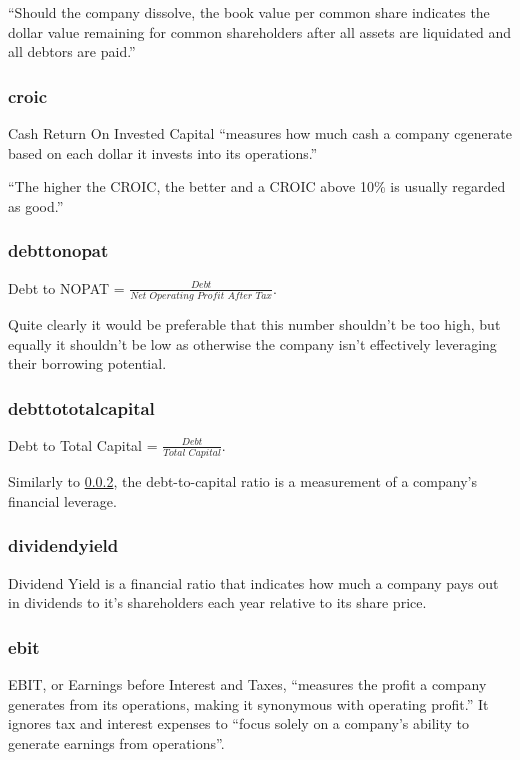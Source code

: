 ``Should the company dissolve, the book value per common share indicates the dollar value remaining for common shareholders after all assets are liquidated and all debtors are paid.'' \cite{bookValuePerShare}

\subsubsection{croic}
Cash Return On Invested Capital ``measures how much cash a company cgenerate based on each dollar it invests into its operations.'' \newline

``The higher the CROIC, the better and a CROIC above 10\% is usually regarded as good.''\cite{croic}

\subsubsection{debttonopat} \label{debttonopat}
Debt to NOPAT = $\frac{Debt}{Net \, \, Operating \, \, Profit \, \, After \, \, Tax}$. \newline

Quite clearly it would be preferable that this number shouldn't be too high, but equally it shouldn't be low as otherwise the company isn't effectively leveraging their borrowing potential.\cite{intrinioDataTags}

\subsubsection{debttototalcapital}
Debt to Total Capital = $\frac{Debt}{Total \, \, Capital}$. \newline

Similarly to \ref{debttonopat}, the debt-to-capital ratio is a measurement of a company's financial leverage.\cite{intrinioDataTags}

\subsubsection{dividendyield}
Dividend Yield is a financial ratio that indicates how much a company pays out in dividends to it's shareholders each year relative to its share price.\cite{intrinioDataTags}

\subsubsection{ebit}
EBIT, or Earnings before Interest and Taxes, ``measures the profit a company generates from its operations, making it synonymous with operating profit.'' It ignores tax and interest expenses to ``focus solely on a company's ability to generate earnings from operations''.\cite{intrinioDataTags}

